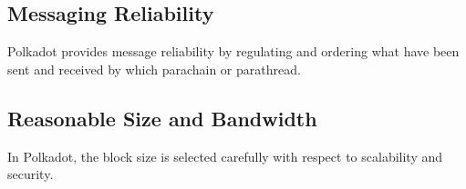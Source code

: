 \subsection{Messaging Reliability} Polkadot provides message reliability by regulating and ordering what  have been sent and received by which parachain or parathread.

\subsection{Reasonable Size and Bandwidth} In Polkadot, the block size is selected carefully with respect to scalability and security. 



